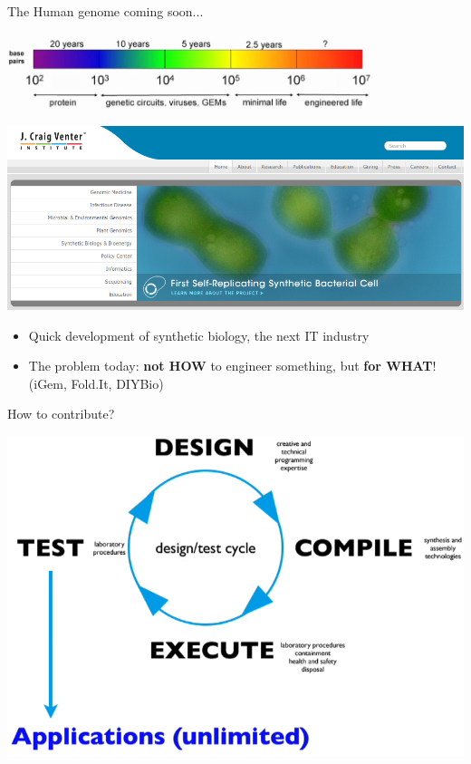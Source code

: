 \begin{frame}{The Human genome coming soon...}
\footnotesize

\begin{center}
\includegraphics[width=0.8\textwidth]{./images/moreComplexAppsOverTime.jpg}
\end{center}
\begin{center}
\includegraphics[width=1.0\textwidth]{./images/VenterInstitute.png}
\end{center}
\begin{itemize}
\footnotesize
  \item Quick development of synthetic biology, the next IT industry
  \item The problem today: \textbf{not HOW} to engineer something, but \textbf{for WHAT}! (iGem, Fold.It, DIYBio)
  \end{itemize}
\end{frame}

\begin{frame}{How to contribute?}
\footnotesize
\begin{center}
\includegraphics[width=1\textwidth]{./images/wheelOfInnovationWhite.png}
\end{center}
\end{frame}


